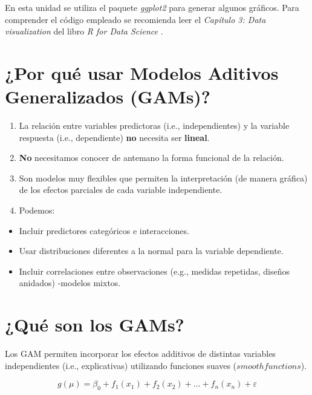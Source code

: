 \documentclass[
]{book}
\providecommand{\tightlist}{%
  \setlength{\itemsep}{0pt}\setlength{\parskip}{0pt}}
\begin{document}
En esta unidad se utiliza el paquete \emph{ggplot2} \citep{ggplot2} para generar algunos gráficos. Para comprender el código empleado se recomienda leer el \emph{Capítulo 3: Data visualization} del libro \emph{R for Data Science} \citep{wickham2017r}.

\hypertarget{por-quuxe9-usar-modelos-aditivos-generalizados-gams}{%
\section{¿Por qué usar Modelos Aditivos Generalizados (GAMs)?}\label{por-quuxe9-usar-modelos-aditivos-generalizados-gams}}

\begin{enumerate}
\def\labelenumi{\arabic{enumi}.}
\tightlist
\item
  La relación entre variables predictoras (i.e., independientes) y la variable respuesta (i.e., dependiente) \textbf{no} necesita ser \textbf{lineal}.
\item
  \textbf{No} necesitamos conocer de antemano la forma funcional de la relación.
\item
  Son modelos muy flexibles que permiten la interpretación (de manera gráfica) de los efectos parciales de cada variable independiente.
\item
  Podemos:
\end{enumerate}

\begin{itemize}
\tightlist
\item
  Incluir predictores categóricos e interacciones.
\item
  Usar distribuciones diferentes a la normal para la variable dependiente.
\item
  Incluir correlaciones entre observaciones (e.g., medidas repetidas, diseños anidados) -modelos mixtos.
\end{itemize}

\hypertarget{quuxe9-son-los-gams}{%
\section{¿Qué son los GAMs?}\label{quuxe9-son-los-gams}}

Los GAM permiten incorporar los efectos additivos de distintas variables independientes (i.e., explicativas) utilizando funciones suaves (\(smooth functions\)).

\[
g(\mu) = \beta_0 + f_{1}(x_{1}) + f_{2}(x_{2}) + ... + f_{n}(x_{n}) + \varepsilon
\]
\end{document}
